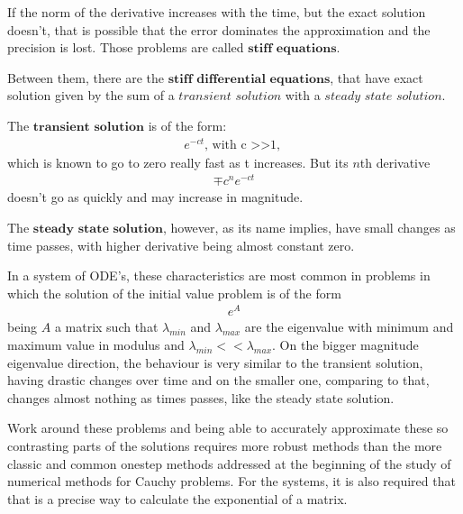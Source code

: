 \documentclass[letterpaper,10pt,english]{jupyterBook}
\begin{document}
\sphinxAtStartPar
If the norm of the derivative increases with the time, but the exact solution doesn’t, that is possible that the error dominates the approximation and the precision is lost. Those problems are called \(\textbf{stiff equations}\).

\sphinxAtStartPar
Between them, there are the \(\textbf{stiff differential equations}\), that have exact solution given by the sum of a \(\textit{transient solution}\) with a \(\textit{steady state solution}\).

\sphinxAtStartPar
The \(\textbf{transient solution}\) is of the form:
\begin{equation*}
\begin{split}
    e^{-ct} \text{, with c >>1, }
\end{split}
\end{equation*}
\sphinxAtStartPar
which is known to go to zero really fast as t increases. But its \(n\)th derivative
\begin{equation*}
\begin{split}
    \mp c^{n}e^{-ct}
\end{split}
\end{equation*}
\sphinxAtStartPar
doesn’t go as quickly and may increase in magnitude.

\sphinxAtStartPar
The \(\textbf{steady state solution}\), however, as its name implies, have small changes as time passes, with higher derivative being almost constant zero.

\sphinxAtStartPar
In a system of ODE’s, these characteristics are most common in problems in which the solution of the initial value problem is of the form
\begin{equation*}
\begin{split}
    e^{A}
\end{split}
\end{equation*}
\sphinxAtStartPar
being \(A\) a matrix such that \(\lambda_{min}\) and \(\lambda_{max}\) are the eigenvalue with minimum and maximum value in modulus and \(\lambda_{min} << \lambda_{max}\). On the bigger magnitude eigenvalue direction, the behaviour is very similar to the transient solution, having drastic changes over time and on the smaller one, comparing to that, changes almost nothing as times passes, like the steady state solution.

\sphinxAtStartPar
Work around these problems and being able to accurately approximate these so contrasting parts of the solutions requires more robust methods than the more classic and common one\sphinxhyphen{}step methods addressed at the beginning of the study of numerical methods for Cauchy problems. For the systems, it is also required that that is a precise way to calculate the exponential of a matrix.
\end{document}
